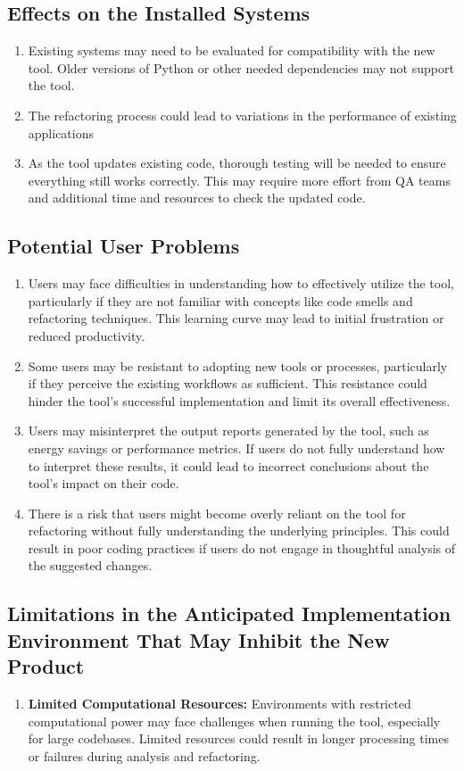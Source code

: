 \documentclass[12pt]{article}
\begin{document}
\subsection{Effects on the Installed Systems}
\begin{enumerate}
  \item Existing systems may need to be evaluated for compatibility
    with the new tool. Older versions of Python or other needed
    dependencies may not support the tool.
  \item The refactoring process could lead to variations in the
    performance of existing applications
  \item As the tool updates existing code, thorough testing will be
    needed to ensure everything still works correctly. This may
    require more effort from QA teams and additional time and
    resources to check the updated code.
\end{enumerate}

\subsection{Potential User Problems}
\begin{enumerate}
  \item Users may face difficulties in understanding how to
    effectively utilize the tool, particularly if they are not
    familiar with concepts like code smells and refactoring
    techniques. This learning curve may lead to initial frustration
    or reduced productivity.
  \item Some users may be resistant to adopting new tools or
    processes, particularly if they perceive the existing workflows
    as sufficient. This resistance could hinder the tool's successful
    implementation and limit its overall effectiveness.
  \item Users may misinterpret the output reports generated by the
    tool, such as energy savings or performance metrics. If users do
    not fully understand how to interpret these results, it could
    lead to incorrect conclusions about the tool's impact on their code.
  \item There is a risk that users might become overly reliant on the
    tool for refactoring without fully understanding the underlying
    principles. This could result in poor coding practices if users
    do not engage in thoughtful analysis of the suggested changes.
\end{enumerate}
\subsection{Limitations in the Anticipated Implementation Environment That May
Inhibit the New Product}
\begin{enumerate}
  \item \textbf{Limited Computational Resources:} Environments with
    restricted computational power may face challenges when running
    the tool, especially for large codebases. Limited resources could
    result in longer processing times or failures during analysis and
    refactoring.
\end{enumerate}
\end{document}
